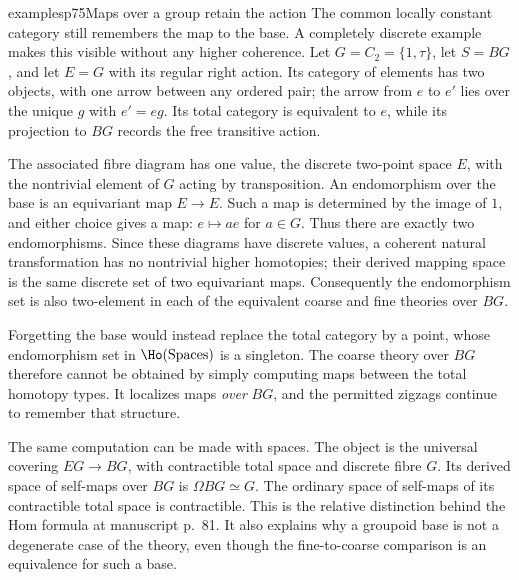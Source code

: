 \begin{dcomment}{examples}{p75}{Maps over a group retain the action}
The common locally constant category still remembers the map to the base. A completely discrete example makes this visible without any higher coherence. Let $G=C_2=\{1,\tau\}$, let $S=BG$, and let $E=G$ with its regular right action. Its category of elements has two objects, with one arrow between any ordered pair; the arrow from $e$ to $e'$ lies over the unique $g$ with $e'=eg$. Its total category is equivalent to $e$, while its projection to $BG$ records the free transitive action.

The associated fibre diagram has one value, the discrete two-point space $E$, with the nontrivial element of $G$ acting by transposition. An endomorphism over the base is an equivariant map $E\to E$. Such a map is determined by the image of $1$, and either choice gives a map: $e\mapsto ae$ for $a\in G$. Thus there are exactly two endomorphisms. Since these diagrams have discrete values, a coherent natural transformation has no nontrivial higher homotopies; their derived mapping space is the same discrete set of two equivariant maps. Consequently the endomorphism set is also two-element in each of the equivalent coarse and fine theories over $BG$.

Forgetting the base would instead replace the total category by a point, whose endomorphism set in $\Ho(\mathrm{Spaces})$ is a singleton. The coarse theory over $BG$ therefore cannot be obtained by simply computing maps between the total homotopy types. It localizes maps \emph{over} $BG$, and the permitted zigzags continue to remember that structure.

The same computation can be made with spaces. The object is the universal covering $EG\to BG$, with contractible total space and discrete fibre $G$. Its derived space of self-maps over $BG$ is $\Omega BG\simeq G$. The ordinary space of self-maps of its contractible total space is contractible. This is the relative distinction behind the Hom formula at manuscript p.~81. It also explains why a groupoid base is not a degenerate case of the theory, even though the fine-to-coarse comparison is an equivalence for such a base.
\end{dcomment}

